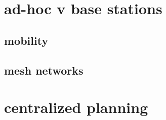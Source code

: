 \section{ad-hoc v base stations}


\subsection{mobility}


\subsection{mesh networks}


\section{centralized planning}


